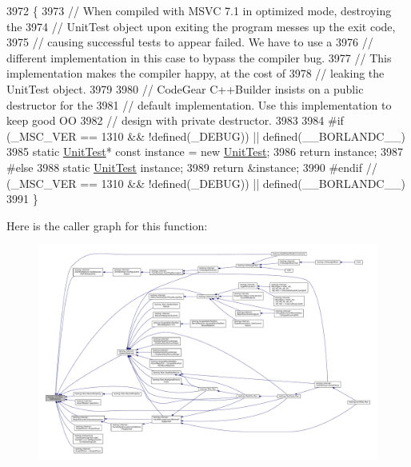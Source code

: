 \begin{DoxyCode}
3972                                 \{
3973   \textcolor{comment}{// When compiled with MSVC 7.1 in optimized mode, destroying the}
3974   \textcolor{comment}{// UnitTest object upon exiting the program messes up the exit code,}
3975   \textcolor{comment}{// causing successful tests to appear failed.  We have to use a}
3976   \textcolor{comment}{// different implementation in this case to bypass the compiler bug.}
3977   \textcolor{comment}{// This implementation makes the compiler happy, at the cost of}
3978   \textcolor{comment}{// leaking the UnitTest object.}
3979 
3980   \textcolor{comment}{// CodeGear C++Builder insists on a public destructor for the}
3981   \textcolor{comment}{// default implementation.  Use this implementation to keep good OO}
3982   \textcolor{comment}{// design with private destructor.}
3983 
3984 \textcolor{preprocessor}{#if (\_MSC\_VER == 1310 && !defined(\_DEBUG)) || defined(\_\_BORLANDC\_\_)}
3985   \textcolor{keyword}{static} \hyperlink{classtesting_1_1UnitTest_a5e646d37f980429c310af696c8775f5c}{UnitTest}* \textcolor{keyword}{const} instance = \textcolor{keyword}{new} \hyperlink{classtesting_1_1UnitTest_a5e646d37f980429c310af696c8775f5c}{UnitTest};
3986   \textcolor{keywordflow}{return} instance;
3987 \textcolor{preprocessor}{#else}
3988   \textcolor{keyword}{static} \hyperlink{classtesting_1_1UnitTest_a5e646d37f980429c310af696c8775f5c}{UnitTest} instance;
3989   \textcolor{keywordflow}{return} &instance;
3990 \textcolor{preprocessor}{#endif  // (\_MSC\_VER == 1310 && !defined(\_DEBUG)) || defined(\_\_BORLANDC\_\_)}
3991 \}
\end{DoxyCode}
Here is the caller graph for this function\+:
\nopagebreak
\begin{figure}[H]
\begin{center}
\leavevmode
\includegraphics[width=350pt]{classtesting_1_1UnitTest_a24192400b70b3b946746954e9574fb8e_icgraph}
\end{center}
\end{figure}
\mbox{\label{classtesting_1_1UnitTest_ad741830280b12c07874b2d37a6ee5c02}} 
